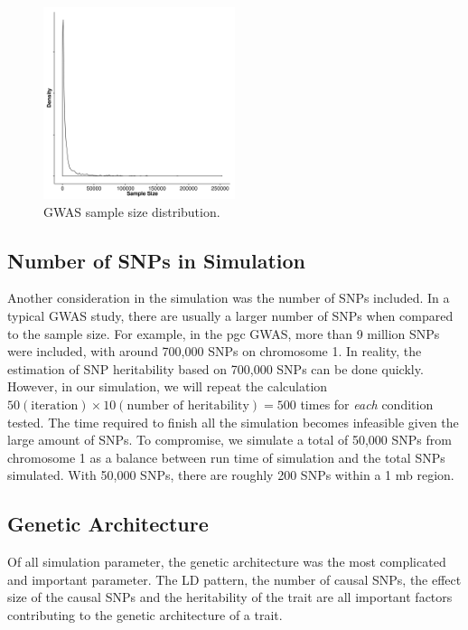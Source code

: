 \documentclass[12pt]{scrbook}
\newcommand*{\glng}{\glsentrylong}
\begin{document}
\begin{figure}
	\centering
	\includegraphics[width=0.5\textwidth]{figure/gwasSampleSize.png}
	\caption[GWAS Sample Size distribution]{
		\gls{GWAS} sample size distribution.
	}
	\label{fig:gwasCata}
\end{figure}

\subsection{Number of SNPs in Simulation}
Another consideration in the simulation was the number of \glspl{SNP} included.
In a typical \gls{GWAS} study, there are usually a larger number of \glspl{SNP} when compared to the sample size. 
For example, in the \gls{pgc} \glng{scz} \gls{GWAS}, more than 9 million \glspl{SNP} were included, with around 700,000 \glspl{SNP} on chromosome 1.
In reality, the estimation of \gls{SNP} heritability based on 700,000 \glspl{SNP} can be done quickly.
However, in our simulation, we will repeat the calculation $50(\text{iteration})\times10(\text{number of heritability})=500$ times for \emph{each} condition tested. 
The time required to finish all the simulation becomes infeasible given the large amount of \glspl{SNP}.
To compromise, we simulate a total of 50,000 \glspl{SNP} from chromosome 1 as a balance between run time of simulation and the total \glspl{SNP} simulated.
With 50,000 \glspl{SNP}, there are roughly 200 \glspl{SNP} within a 1 \gls{mb} region.

\subsection{Genetic Architecture}
Of all simulation parameter, the genetic architecture was the most complicated and important parameter. 
The \gls{LD} pattern, the number of causal \glspl{SNP}, the effect size of the causal \glspl{SNP} and the heritability of the trait are all important factors contributing to the genetic architecture of a trait. 
\end{document}
